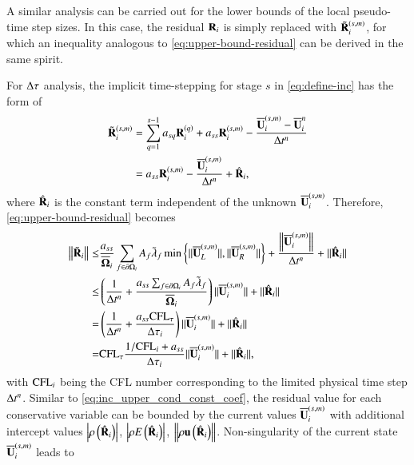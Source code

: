 A similar analysis can be carried out for the lower bounds of the local pseudo-time step sizes. In this case, the residual $\mathbf{R}_i$ is simply replaced with $\tilde{\mathbf{R}}_i^{(s,m)}$, for which an inequality analogous to \eqref{eq:upper-bound-residual} can be derived in the same spirit. 

For $\mathrm\Delta\tau$ analysis, 
the implicit time-stepping  for stage $s$ in \eqref{eq:define-inc}
has the form of
\begin{equation}
    \begin{aligned}
        \tilde{\mathbf{R}}_i^{\left(s,m\right)} & = \sum_{q=1}^{s-1} a_{sq} \mathbf{R}_i^{\left(q\right)} + 
    a_{ss} \mathbf{R}_i^{\left(s,m\right)} - 
    \dfrac{\overline{\mathbf{U}}_i^{\left(s,m\right)} - \overline{\mathbf{U}}_i^{n}}{\mathrm\Delta t^n} \\
    & =  a_{ss} \mathbf{R}_i^{\left(s,m\right)} - 
    \dfrac{\overline{\mathbf{U}}_i^{\left(s,m\right)}}{\mathrm\Delta t^n}
    + \hat{\mathbf{R}}_i,
    \end{aligned}
\end{equation}
where $\hat{\mathbf{R}}_i$ is the constant term independent of the unknown
$\overline{\mathbf{U}}_i^{\left(s,m\right)}$. 
Therefore, \eqref{eq:upper-bound-residual} becomes
\begin{equation}
\label{eq:upper-bound-residual-tau}
\begin{aligned}
    \left\| \tilde{\mathbf{R}}_i \right\| 
    \leq & \frac{a_{ss}}{\overline{\mathbf{\Omega}}_i} \sum_{f \in \partial \Omega_i}{
        A_{f} \tilde{\lambda}_{f} \min \left\{\|\overline{\mathbf{U}}_L^{\left(s,m\right)}\|, \|\overline{\mathbf{U}}_R^{\left(s,m\right)}\| \right\}
    } 
    + \dfrac{\left\|\overline{\mathbf{U}}_i^{\left(s,m\right)}\right\|}{\mathrm\Delta t^n}
    + \|\hat{\mathbf{R}}_i\|
    \\
    \leq & \left(
    \frac{1}{\mathrm\Delta t^n} + 
    \frac{a_{ss}\sum_{f \in \partial \Omega_i} A_f\tilde{\lambda}_f}{\overline{\mathbf{\Omega}}_i}
    \right)
    \|\overline{\mathbf{U}}_i^{\left(s,m\right)}\|
    + \|\hat{\mathbf{R}}_i\|\\
    = &
    \left(\frac{1}{\mathrm\Delta t^n} + \frac{a_{ss}\text{CFL}_\tau}{\mathrm\Delta \tau_i} \right)\|\overline{\mathbf{U}}_i^{\left(s,m\right)}\| 
    + \|\hat{\mathbf{R}}_i\|\\
    = &
     \text{CFL}_\tau\frac{1 / \text{CFL}_i + a_{ss}}{\mathrm\Delta \tau_i}
     \|\overline{\mathbf{U}}_i^{\left(s,m\right)}\| 
    + \|\hat{\mathbf{R}}_i\|,
\end{aligned}
\end{equation}
with $\text{CFL}_i$ being the CFL number corresponding to the limited
physical time step
$\mathrm\Delta t^n$.
Similar to \eqref{eq:inc_upper_cond_const_coef}, 
the residual value for each conservative variable can be 
bounded by the current values $\overline{\mathbf{U}}_i^{\left(s,m\right)}$ with additional 
intercept values $\left| \rho\left(\hat{\mathbf{R}}_i\right) \right|$, 
$\left | \rho E\left(\hat{\mathbf{R}}_i\right) \right|$, 
$\left\|\rho\mathbf{u}\left(\hat{\mathbf{R}}_i\right) \right\|$. 
Non-singularity of the current state $\overline{\mathbf{U}}_i^{\left(s,m\right)}$ leads to 
